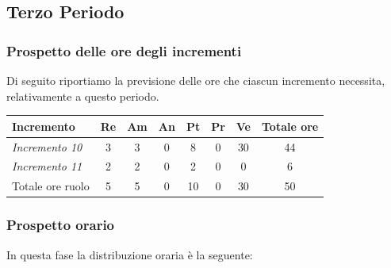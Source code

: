{{{{{{{{{{{{\subsection{Terzo Periodo}\label{PreventivoFaseDiProgettazioneDiDettaglioECodificaPeriodo3}

\subsubsection{Prospetto delle ore degli incrementi}\label{PreventivoFaseDiProgettazioneDiDettaglioECodificaPeriodo3Incrementi}
Di seguito riportiamo la previsione delle ore che ciascun incremento necessita, relativamente a questo periodo.
\quad
\def\tabularxcolumn#1{m{#1}}
{

	\begin{center}
		\renewcommand{\arraystretch}{1.4}
		\begin{tabularx}{\textwidth}{|X|c|c|c|c|c|c|c|}
			\hline
			\rowcolor{airforceblue}
			\textbf{Incremento} & \textbf{Re} & \textbf{Am} & \textbf{An} & \textbf{Pt} & \textbf{Pr} & \textbf{Ve} & \textbf{Totale ore}\\
			\hline
			\textit{Incremento 10} & 3 & 3 & 0 & 8 & 0 & 30 & 44\\
			\hline
			\textit{Incremento 11} & 2 & 2 & 0 & 2 & 0 & 0 & 6\\
			\hline
			Totale ore ruolo & 5 & 5 & 0 & 10 & 0 & 30 & 50\\
			\hline
		\end{tabularx}
	\end{center}

	\subsubsection{Prospetto orario}\label{PreventivoFaseDiProgettazioneDiDettaglioECodificaProspettoOrarioPeriodo3}
	In questa fase la distribuzione oraria è la seguente:
	\quad
	\def\tabularxcolumn#1{m{#1}}
	{

}}}}}}}}}}}}}}
